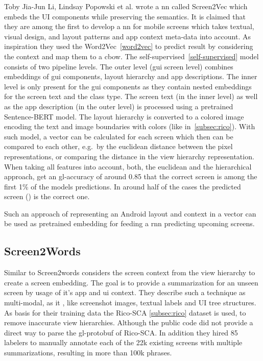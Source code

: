 Toby Jia-Jun Li, Lindsay Popowski et al. \cite{li2021screen2vec} wrote a \gls{nn} called Screen2Vec which embeds the UI components while preserving the semantics.
It is claimed that they are among the first to develop a \gls{nn} for mobile screens which takes textual, visual design, and layout patterns and app context meta-data into account.
As inspiration they used the Word2Vec~\ref{word2vec} to predict result by considering the context and map them to a \gls{cbow}.
The self-supervised~\ref{self-supervised} model consists of two pipeline levels.
The outer level (\gls{gui} screen level) combines embeddings of \gls{gui} components, layout hierarchy and app descriptions.
The inner level is only present for the \gls{gui} components as they contain nested embeddings for the screen text and the class type.
The screen text (in the inner level) as well as the app description (in the outer level) is processed using a pretrained Sentence-BERT model.
The layout hierarchy is converted to a colored image encoding the text and image boundaries with colors (like in~\ref{subsec:rico}).
With such model, a vector can be calculated for each screen which then can be compared to each other, e.g.\ by the euclidean distance between the pixel representations, or comparing the distance in the view hierarchy representation.
When taking all features into account, both, the euclidean and the hierarchical approach, get an \gls{gl-accuracy} of around 0.85 that the correct screen is among the first 1\% of the models predictions.
In around half of the cases the predicted screen () is the correct one.

Such an approach of representing an Android layout and context in a vector can be used as pretrained embedding for feeding a \gls{rnn} predicting upcoming screens.

\subsection{Screen2Words}
\label{subsec:screen2words}

Similar to \cite{li2021screen2vec} Screen2words \cite{wang2021screen2words} considers the screen context from the view hierarchy to create a screen embedding.
The goal is to provide a summarization for an unseen screen by usage of it's app and \gls{ui} context.
They describe such a technique as multi-modal, as it , like screenshot images, textual labels and UI tree structures.
As basis for their training data the Rico-SCA \ref{subsec:rico} dataset is used, to remove inaccurate view hierarchies.
Although the public code did not provide a direct way to parse the \Gls{gl-protobuf} of Rico-SCA.
In addition they hired 85 labelers to manually annotate each of the 22k existing screens with multiple summarizations, resulting in more than 100k phrases.

